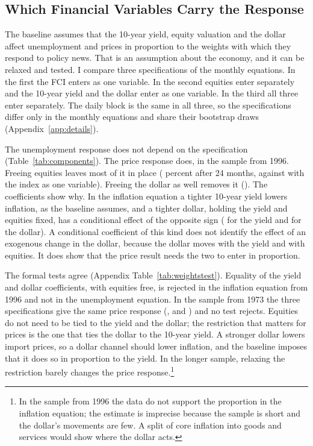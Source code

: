 \documentclass[11pt]{article}
\begin{document}
\subsection{Which Financial Variables Carry the Response}\label{sec:components}
The baseline assumes that the 10-year yield, equity valuation and the dollar affect unemployment and prices in proportion to the weights with which they respond to policy news. That is an assumption about the economy, and it can be relaxed and tested. I compare three specifications of the monthly equations. In the first the FCI enters as one variable. In the second equities enter separately and the 10-year yield and the dollar enter as one variable. In the third all three enter separately. The daily block is the same in all three, so the specifications differ only in the monthly equations and share their bootstrap draws (Appendix~\ref{app:details}).



The unemployment response does not depend on the specification (Table~\ref{tab:components}). The price response does, in the sample from 1996. Freeing equities leaves most of it in place ( percent after 24 months, against  with the index as one variable). Freeing the dollar as well removes it (). The coefficients show why. In the inflation equation a tighter 10-year yield lowers inflation, as the baseline assumes, and a tighter dollar, holding the yield and equities fixed, has a conditional effect of the opposite sign ( for the yield and  for the dollar). A conditional coefficient of this kind does not identify the effect of an exogenous change in the dollar, because the dollar moves with the yield and with equities. It does show that the price result needs the two to enter in proportion.

The formal tests agree (Appendix Table~\ref{tab:weightstest}). Equality of the yield and dollar coefficients, with equities free, is rejected in the inflation equation from 1996 and not in the unemployment equation. In the sample from 1973 the three specifications give the same price response (,  and ) and no test rejects. Equities do not need to be tied to the yield and the dollar; the restriction that matters for prices is the one that ties the dollar to the 10-year yield. A stronger dollar lowers import prices, so a dollar channel should lower inflation, and the baseline imposes that it does so in proportion to the yield. In the longer sample, relaxing the restriction barely changes the price response.\footnote{In the sample from 1996 the data do not support the proportion in the inflation equation; the estimate is imprecise because the sample is short and the dollar's movements are few. A split of core inflation into goods and services would show where the dollar acts.}
\end{document}
